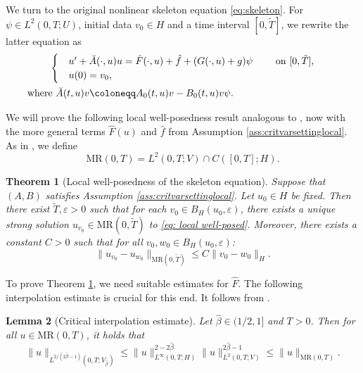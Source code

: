 \documentclass{amsart}
\renewcommand{\MR}{\mathrm{MR}}
\newcommand{\<}{\langle}
\newcommand{\?}{\rangle}
\newcommand{\ceqq}{\coloneqq}
\theoremstyle{plain}
\newtheorem{theorem}{Theorem}[section]
\theoremstyle{remark}
\theoremstyle{plain}
\newtheorem{lemma}[theorem]{Lemma}
\numberwithin{equation}{section}
\newcommand{\eps}{\varepsilon}
\begin{document}
We turn to the original nonlinear skeleton equation \eqref{eq:skeleton}. 
For $\psi\in L^2(0,T;U)$,  initial data $v_0\in H$ and a time interval  $[0,\tilde{T}]$, we rewrite the latter equation as
\begin{align}\label{eq: local well-posed}
 & \begin{cases}
    &u'+\breve{A}(\cdot,u)u=\hat{F}(\cdot,u)+\hat{f}+(G(\cdot,u)+g)\psi\qquad \text{ on } [0,\tilde{T}], \\
    &u(0)=v_0,
  \end{cases}\\ &\hspace{-.9cm}\text{ where } \breve{A}(t,u)v\ceqq A_0(t,u)v-B_0(t,u)v\psi. \notag
\end{align}

We will prove the following local well-posedness result analogous to \cite[Th.\ 3.7]{TV24},  now with the more general terms $\hat{F}(u)$ and $\hat{f}$ from Assumption \ref{ass:critvarsettinglocal}. 
As in \cite{TV24}, we define 
\[
\MR(0,T)=L^2(0,T;V)\cap C([0,T];H).
\]

\begin{theorem}[Local well-posedness of the skeleton equation]\label{th: local well posedness skeleton}
Suppose that $(A,B)$ satisfies Assumption \ref{ass:critvarsettinglocal}. 
Let $u_0\in H$ be fixed. Then there exist $\tilde{T},\eps>0$ such that for each $v_0\in B_H(u_0,\eps)$,
there exists a unique strong solution $u_{v_0}\in \MR(0,\tilde{T})$ to
\eqref{eq: local well-posed}. 
Moreover, there exists a constant $C>0$ such that for all $v_0,w_0\in B_H(u_0,\eps)$:
\begin{equation}\label{eq: ct dependence local well-posed}
  \|u_{v_0}-u_{w_0}\|_{\MR(0,\tilde{T})}\leq C\|v_0-w_0\|_H.
\end{equation}
\end{theorem}

To prove Theorem \ref{th: local well posedness skeleton}, we need suitable   estimates for $\hat{F}$.  
The following interpolation estimate is crucial for this end. It follows from \cite[Lem.\ 2.5, (5.48)]{BGV}.  

\begin{lemma}[Critical interpolation estimate]\label{lem:crit interpol}
Let  $\hat{\beta}\in (1/2,1]$ and $T>0$.    
Then for all $u\in \MR(0,T)$, it holds that 
\begin{equation*} 
  \|u\|_{L^{{2}/({2\hat{\beta}-1})}(0,T;V_{\hat{\beta}})}\leq   \|u\|_{L^{\infty}(0,T;H)}^{2-2\hat{\beta}}\|u\|_{L^{2}(0,T;V)}^{2\hat{\beta}-1}\leq \|u\|_{\MR(0,T)}.
\end{equation*}
\end{lemma} 
\end{document}
